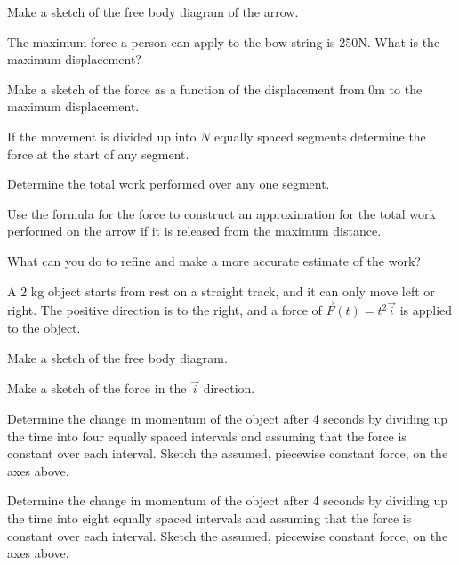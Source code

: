 \begin{problem}
\begin{subproblem}
    \item Make a sketch of the free body diagram of the arrow.
      \vfill
    \item The maximum force a person can apply to the bow string is
      250N. What is the maximum displacement?
      \vfill
    \item Make a sketch of the force as a function of the displacement
      from 0m to the maximum displacement.
      \vfill
      \clearpage
    \item If the movement is divided up into $N$ equally spaced segments
      determine the force at the start of any segment.
      \vfill
    \item Determine the total work performed over any one segment.
      \vfill
    \item Use the formula for the force to construct an approximation
      for the total work performed on the arrow if it is released from
      the maximum distance.
      \vfill
    \item What can you do to refine and make a more accurate estimate of
      the work?
    \end{subproblem}
\item A 2 kg object starts from rest on a straight track, and it can
  only move left or right. The positive direction is to the right, and
  a force of $\vec{F}(t)=t^2 \vec{i}$ is applied to the object.

  \begin{subproblem}
    \item Make a sketch of the free body diagram.
      \vspace{4em}
    \item Make a sketch of the force in the $\vec{i}$ direction. \\
      \scalebox{0.5}{}

    \item Determine the change in momentum of the object after 4
      seconds by dividing up the time into four equally spaced
      intervals and assuming that the force is constant over each
      interval. Sketch the assumed, piecewise constant force, on the
      axes above.
      \vfill
    \item Determine the change in momentum of the object after 4
      seconds by dividing up the time into eight equally spaced
      intervals and assuming that the force is constant over each
      interval. Sketch the assumed, piecewise constant force, on the
      axes above.
      \vfill
  \end{subproblem}


\end{problem}
